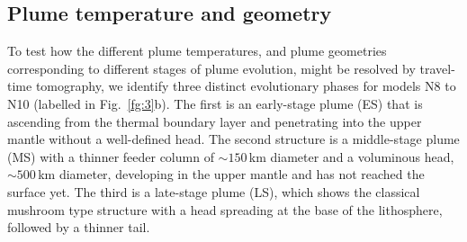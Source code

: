 \documentclass[a4paper,10pt,twocolumn]{paper}
\begin{document}
\subsection{Plume temperature and geometry}

To test how the different plume temperatures, and plume geometries corresponding to different stages of plume evolution, might be resolved by travel-time tomography, we identify three distinct evolutionary phases for models N8 to N10 (labelled in Fig.~\ref{fg:3}b). The first is an early-stage plume (ES) that is ascending from the thermal boundary layer and penetrating into the upper mantle without a well-defined head. The second structure is a middle-stage plume (MS) with a thinner feeder column of $\sim 150$\,km diameter and a voluminous head, $\sim 500$\,km diameter, developing in the upper mantle and has not reached the surface yet. The third is a late-stage plume (LS), which shows the classical mushroom type structure with a head spreading at the base of the lithosphere, followed by a thinner tail.
\end{document}
